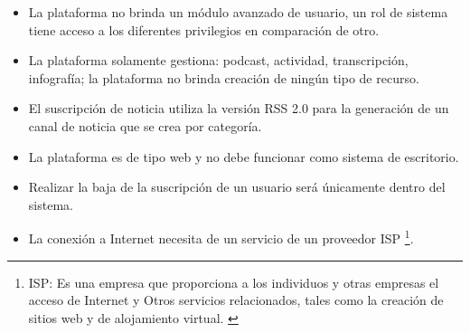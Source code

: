 \begin{itemize}

\item La plataforma no brinda un módulo avanzado de usuario, un rol de sistema
tiene acceso a los diferentes privilegios en comparación de otro.

\item La plataforma solamente gestiona: podcast, actividad, transcripción,
infografía; la plataforma no brinda creación de ningún tipo de recurso.

\item El suscripción de noticia utiliza la versión RSS 2.0 para la generación
de un canal de noticia que se crea por categoría.

\item La plataforma es de tipo web y no debe funcionar como sistema
de escritorio.

\item Realizar la baja de la suscripción de un usuario será únicamente dentro
del sistema.

\item La conexión a Internet necesita de un servicio de un proveedor ISP
\footnote{ISP: Es una empresa que proporciona a los individuos y otras empresas
el acceso de Internet y Otros servicios relacionados, tales como la creación
de sitios web y de alojamiento virtual. \cite{isp}}. 

\end{itemize}